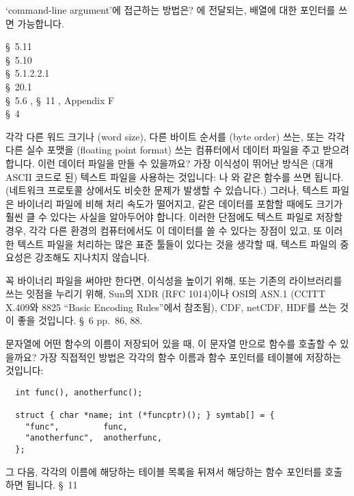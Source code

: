 \begin{faq}
	`command-line argument'에 접근하는 방법은?
\A
	에 전달되는,  배열에 대한 포인터를 쓰면
	가능합니다.  

\R
	\cite{kr1} \S\ 5.11  \\
	\cite{kr2} \S\ 5.10  \\
	\cite{c89} \S\ 5.1.2.2.1 \\
	\cite{hs} \S\ 20.1  \\
	\cite{pcs} \S\ 5.6 , \S\ 11 ,
		 Appendix F \\
	\cite{swsolution} \S\ 4 
\end{faq}

\begin{faq}
	각각 다른 워드 크기나 (word size), 다른 바이트 순서를 (byte order)
	쓰는, 또는 각각 다른 실수 포맷을 (floating point format) 쓰는
	컴퓨터에서 데이터 파일을 주고 받으려 합니다.  이런 데이터 파일을
	만들 수 있을까요?
\A
	가장 이식성이 뛰어난 방식은 (대개 ASCII 코드로 된) 텍스트 파일을
	사용하는 것입니다: 나 와 같은 함수를
	쓰면 됩니다.  (네트워크 프로토콜 상에서도 비슷한 문제가 발생할 수
	있습니다.)
	그러나, 텍스트 파일은 바이너리 파일에 비해 처리 속도가 떨어지고,
	같은 데이터를 포함할 때에도 크기가 훨씬 클 수 있다는 사실을
	알아두어야 합니다.  이러한 단점에도 텍스트 파일로 저장할 경우,
	각각 다른 환경의 컴퓨터에서도 이 데이터를 쓸 수 있다는 장점이
	있고, 또 이러한 텍스트 파일을 처리하는 많은 표준 툴들이 있다는
	것을 생각할 때, 텍스트 파일의 중요성은 강조해도 지나치지 않습니다.

	꼭 바이너리 파일을 써야만 한다면, 이식성을 높이기 위해, 또는
	기존의 라이브러리를 쓰는 잇점을 누리기 위해, Sun의 XDR (RFC 1014)이나
	OSI의 ASN.1 (CCITT X.409와 \cite{c89} 8825 ``Basic Encoding Rules''에서
	참조됨), CDF, netCDF, HDF를 쓰는 것이 좋을 것입니다.
\R
	\cite{pcs} \S\ 6 pp.\ 86, 88.
\end{faq}

\begin{faq}
	문자열에 어떤 함수의 이름이 저장되어 있을 때, 이 문자열 만으로
	함수를 호출할 수 있을까요?
\A
	가장 직접적인 방법은 각각의 함수 이름과 함수 포인터를 테이블에
	저장하는 것입니다:

\begin{verbatim}
  int func(), anotherfunc();

  struct { char *name; int (*funcptr)(); } symtab[] = {
    "func",         func,
    "anotherfunc",  anotherfunc,
  };
\end{verbatim}
	
	\noindent 그 다음, 각각의 이름에 해당하는 테이블 목록을 뒤져서
	해당하는 함수 포인터를 호출하면 됩니다.  
\R
	\cite{pcs} \S\ 11 
\end{faq}

